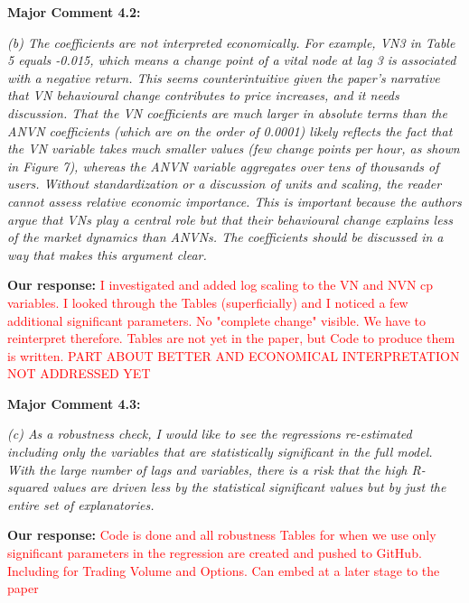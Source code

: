 \documentclass[11pt]{article}
\newcommand{\reviewercomment}[1]{\begin{commentbox}\textit{#1}\end{commentbox}}
\newcommand{\ourresponse}[1]{\textbf{Our response:} #1}
\begin{document}
\bigskip

\textbf{Major Comment 4.2:}

\reviewercomment{%
	(b) The coefficients are not interpreted economically. For example, VN3 in Table 5 equals -0.015, which means a change point of a vital node at lag 3 is associated with a negative
	return. This seems counterintuitive given the paper's narrative that VN behavioural change contributes to price increases, and it needs discussion. That the VN coefficients are much larger in absolute terms than the ANVN coefficients (which are on the order of 0.0001) likely reflects the fact that the VN variable takes much smaller values (few change points per hour, as shown in Figure 7), whereas the ANVN variable aggregates over tens of thousands of users. Without standardization or a discussion of units and scaling, the reader cannot assess relative economic importance. This is important because the authors argue that VNs play a central role but that their behavioural change explains less of the market dynamics than ANVNs. The coefficients should be discussed in a way that makes this argument clear. 
}

\ourresponse{
	\textcolor{red}{I investigated and added log scaling to the VN and NVN cp variables. I looked through the Tables (superficially) and I noticed a few additional significant parameters. No "complete change" visible. We have to reinterpret therefore. Tables are not yet in the paper, but Code to produce them is written. PART ABOUT BETTER AND ECONOMICAL INTERPRETATION NOT ADDRESSED YET}
}

\bigskip

\textbf{Major Comment 4.3:}

\reviewercomment{%
	(c) As a robustness check, I would like to see the regressions re-estimated including only the variables that are statistically significant in the full model. With the large number of lags and variables, there is a risk that the high R-squared values are driven less by the statistical significant values but by just the entire set of explanatories. 
}

\ourresponse{
	\textcolor{red}{Code is done and all robustness Tables for when we use only significant parameters in the regression are created and pushed to GitHub. Including for Trading Volume and Options. Can embed at a later stage to the paper}
}

\bigskip
\end{document}
